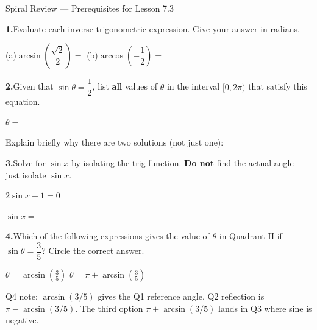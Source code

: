 \documentclass[10pt]{article}
\begin{document}
\namedateperiod

\vspace{0.10in}

\begin{notesbox}{Spiral Review --- Prerequisites for Lesson 7.3}

\textbf{1.}\quad Evaluate each inverse trigonometric expression.
Give your answer in radians.

\vspace{4pt}
(a)\quad $\arcsin\!\left(\dfrac{\sqrt{2}}{2}\right) = $ 
\hspace{1cm}
(b)\quad $\arccos\!\left(-\dfrac{1}{2}\right) = $ 

\vspace{0.14in}
\textbf{2.}\quad Given that $\sin\theta = \dfrac{1}{2}$, list \textbf{all}
values of $\theta$ in the interval $[0, 2\pi)$ that satisfy this equation.

\vspace{4pt}
$\theta = $ 

\vspace{4pt}
Explain briefly why there are two solutions (not just one):

\vspace{0.14in}
\textbf{3.}\quad Solve for $\sin x$ by isolating the trig function.
\textbf{Do not} find the actual angle --- just isolate $\sin x$.

\vspace{4pt}
\hspace{1em}$2\sin x + 1 = 0$

\vspace{6pt}
$\sin x = $ 

\vspace{0.14in}
\textbf{4.}\quad Which of the following expressions gives the value of
$\theta$ in Quadrant II if $\sin\theta = \dfrac{3}{5}$?
Circle the correct answer.

\vspace{4pt}
\hspace{2em}
$\displaystyle\theta = \arcsin\!\!\left(\tfrac{3}{5}\right)$
\hspace{2em}
\hspace{2em}
$\displaystyle\theta = \pi + \arcsin\!\!\left(\tfrac{3}{5}\right)$

\begin{teachernote}
Q4 note: $\arcsin(3/5)$ gives the Q1 reference angle. Q2 reflection is
$\pi - \arcsin(3/5)$. The third option $\pi + \arcsin(3/5)$ lands in Q3
where sine is negative.
\end{teachernote}

\end{notesbox}
\end{document}
